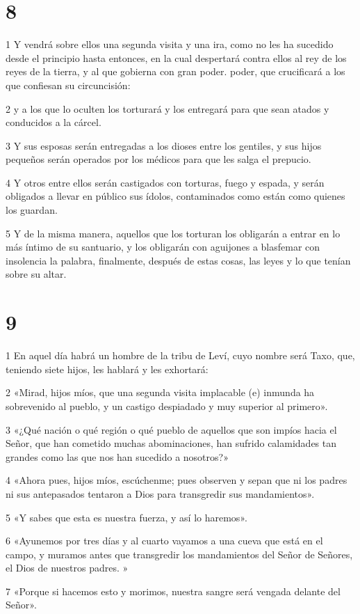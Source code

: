 \chapter{8}

\par 1 Y vendrá sobre ellos una segunda visita y una ira, como no les ha sucedido desde el principio hasta entonces, en la cual despertará contra ellos al rey de los reyes de la tierra, y al que gobierna con gran poder. poder, que crucificará a los que confiesan su circuncisión:
\par 2 y a los que lo oculten los torturará y los entregará para que sean atados y conducidos a la cárcel.
\par 3 Y sus esposas serán entregadas a los dioses entre los gentiles, y sus hijos pequeños serán operados por los médicos para que les salga el prepucio.
\par 4 Y otros entre ellos serán castigados con torturas, fuego y espada, y serán obligados a llevar en público sus ídolos, contaminados como están como quienes los guardan.
\par 5 Y de la misma manera, aquellos que los torturan los obligarán a entrar en lo más íntimo de su santuario, y los obligarán con aguijones a blasfemar con insolencia la palabra, finalmente, después de estas cosas, las leyes y lo que tenían sobre su altar.

\chapter{9}

\par 1 En aquel día habrá un hombre de la tribu de Leví, cuyo nombre será Taxo, que, teniendo siete hijos, les hablará y les exhortará:
\par 2 «Mirad, hijos míos, que una segunda visita implacable (e) inmunda ha sobrevenido al pueblo, y un castigo despiadado y muy superior al primero».
\par 3 «¿Qué nación o qué región o qué pueblo de aquellos que son impíos hacia el Señor, que han cometido muchas abominaciones, han sufrido calamidades tan grandes como las que nos han sucedido a nosotros?»
\par 4 «Ahora pues, hijos míos, escúchenme; pues observen y sepan que ni los padres ni sus antepasados ​​tentaron a Dios para transgredir sus mandamientos».
\par 5 «Y sabes que esta es nuestra fuerza, y así lo haremos».
\par 6 «Ayunemos por tres días y al cuarto vayamos a una cueva que está en el campo, y muramos antes que transgredir los mandamientos del Señor de Señores, el Dios de nuestros padres. »
\par 7 «Porque si hacemos esto y morimos, nuestra sangre será vengada delante del Señor».

